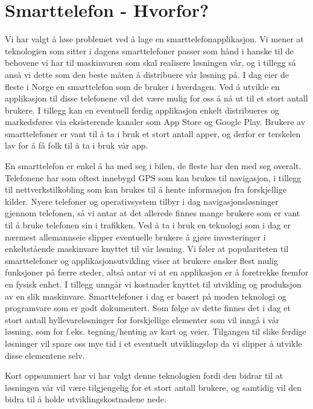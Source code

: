 \documentclass[a4paper,norsk,oneside]{book}
\begin{document}
\section{Smarttelefon - Hvorfor?}
\label{sec:smarttelefon}

Vi har valgt å løse problemet ved å lage en smarttelefonapplikasjon. Vi mener at teknologien som sitter i dagens smarttelefoner passer som hånd i hanske til de behovene vi har til maskinvaren som skal realisere løsningen vår, og i tillegg så anså vi dette som den beste måten å distribuere vår løsning på. I dag eier de fleste i Norge en smarttelefon som de bruker i hverdagen. Ved å utvikle en applikasjon til disse telefonene vil det være mulig for oss å nå ut til et stort antall brukere. I tillegg kan en eventuell ferdig applikasjon enkelt distribueres og markedsføres via eksisterende kanaler som App Store og Google Play. Brukere av smarttelefoner er vant til å ta i bruk et stort antall apper, og derfor er terskelen lav for å få folk til å ta i bruk vår app.

En smarttelefon er enkel å ha med seg i bilen, de fleste har den med seg overalt. Telefonene har som oftest innebygd GPS som kan brukes til navigasjon, i tillegg til nettverkstilkobling som kan brukes til å hente informasjon fra forskjellige kilder. Nyere telefoner og operativsystem tilbyr i dag navigasjonsløsninger gjennom telefonen, så vi antar at det allerede finnes mange brukere som er vant til å bruke telefonen sin i trafikken. Ved å ta i bruk en teknologi som i dag er nærmest allemannseie slipper eventuelle brukere å gjøre investeringer i enkeltstående maskinvare knyttet til vår løsning. Vi føler at populariteten til smarttelefoner og applikasjonsutvikling viser at brukere ønsker flest mulig funksjoner på færre steder, altså antar vi at en applikasjon er å foretrekke fremfor en fysisk enhet. I tillegg unngår vi kostnader knyttet til utvikling og produksjon av en slik maskinvare. Smarttelefoner i dag er basert på moden teknologi og programvare som er godt dokumentert. Som følge av dette finnes det i dag et stort antall hyllevareløsninger for forskjellige elementer som vil inngå i vår løsning, som for f.eks. tegning/henting av kart og veier. Tilgangen til slike ferdige løsninger vil spare oss mye tid i et eventuelt utviklingsløp da vi slipper å utvikle disse elementene selv.

Kort oppsummert har vi har valgt denne teknologien fordi den bidrar til at løsningen vår vil være tilgjengelig for et stort antall brukere, og samtidig vil den bidra til å holde utviklingskostnadene nede.
\end{document}
